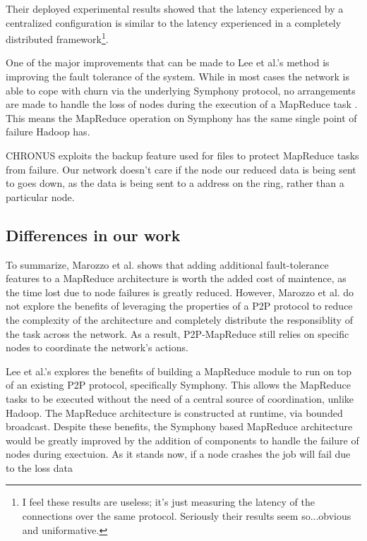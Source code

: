 \documentclass[conference, compsocconf, letterpaper]{IEEEtran}
\begin{document}
Their deployed experimental results showed that the latency experienced by a centralized configuration is similar to the latency experienced in a completely distributed framework\footnote{I feel these results are useless; it's just measuring the latency of the connections over the same protocol.  Seriously their results seem so...obvious and uniformative.}.

One of the major improvements that can be made to Lee et al.'s method is improving the fault tolerance of the system.  While in most cases the network is able to cope with churn via the underlying Symphony protocol, no arrangements are made to handle the loss of nodes during the execution of a MapReduce task \cite{leemap}.  This means the MapReduce operation on Symphony has the same single point of failure Hadoop has. 

CHRONUS exploits the backup feature used for files to protect MapReduce tasks from failure.  Our network doesn't care if the node our reduced data is being sent to goes down, as the data is being sent to a address on the ring, rather than a particular node.

\subsection{Differences in our work}


To summarize, Marozzo et al. \cite{marozzo2012p2p} shows that adding additional fault-tolerance features to a MapReduce architecture is worth the added cost of maintence, as the time lost due to node failures is greatly reduced.  However, Marozzo et al. do not explore the benefits of leveraging the properties of a P2P protocol to reduce the complexity of the architecture and completely distribute the responsiblity of the task across the network.  As a result, P2P-MapReduce still relies on specific nodes to coordinate the network's actions.

Lee et al.'s \cite{leemap} explores the benefits of building a MapReduce module to run on top of an existing P2P protocol, specifically Symphony.  This allows the MapReduce tasks to be executed without the need of a central source of coordination, unlike Hadoop.  The MapReduce architecture is constructed at runtime, via bounded broadcast. Despite these benefits, the Symphony based MapReduce architecture would be greatly improved by the addition of components to handle the failure of nodes during exectuion.  As it stands now, if a node crashes the job will fail due to the loss data
\end{document}
